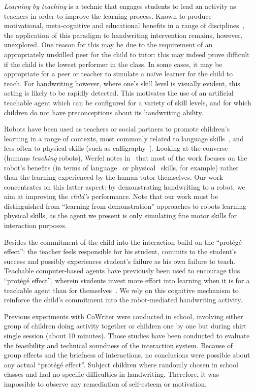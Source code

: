 \documentclass{sig-alternate}
\begin{document}
\emph{Learning by teaching} is a technic that engages students to lead an
activity as teachers in order to improve the learning process. Known to produce
motivational, meta-cognitive and educational benefits in a range of disciplines~\cite{Rohrbeck2003},
the application of this paradigm to handwriting intervention remains, however,
unexplored. One reason for this may be due to the requirement of an
appropriately unskilled peer for the child to tutor: this may indeed prove
difficult if the child is the lowest performer in the class.  In some cases, it
may be appropriate for a peer or teacher to simulate a na\"ive learner for the
child to teach. For handwriting however, where one's skill level is visually
evident, this acting is likely to be rapidly detected. This motivates the use of
an artificial teachable agent which can be configured for a variety of skill
levels, and for which children do not have preconceptions about its handwriting
ability.

Robots have been used as teachers or social partners to promote children's
learning in a range of contexts, most commonly related to language
skills~\cite{han2010robot}, and less often to physical skills (such as
calligraphy~\cite{Matsui2013}). Looking at the converse (humans \emph{teaching}
robots), Werfel notes in~\cite{Werfel2014} that most of the work focuses on the
robot's benefits (in terms of language~\cite{Saunders2010} or
physical~\cite{Mulling2013} skills, for example) rather than the learning
experienced by the human tutor themselves.  Our work concentrates on this latter
aspect: by demonstrating handwriting to a robot, we aim at improving the
\emph{child's} performance. Note that our work must be distinguished from
``learning from demonstration'' approaches to robots learning physical skills,
as the agent we present is only simulating fine motor skills for interaction
purposes.

Besides the commitment of the child into the interaction build on the
``prot\'eg\'e effect'': the teacher feels responsible for his student, commits
to the student's success and possibly experiences student's failure as his own
failure to teach. Teachable computer-based agents have previously been used to
encourage this ``prot\'eg\'e effect'', wherein students invest more effort into
learning when it is for a teachable agent than for themselves~\cite{Chase2009}.
We rely on this cognitive mechanism to reinforce the child's commitment into the
robot-mediated handwriting activity.

Previous experiments with CoWriter were conducted in
school, involving either group of children doing activity together \cite{Hood} or children
one by one but during shirt single session (about 10 minutes). Those
studies have been conducted to evaluate the feasibility and technical soundness
of the interaction system. Because of group effects and the briefness of
interactions, no conclusions were possible about any actual ``prot\'eg\'e
effect''. Subject children where randomly chosen in school
classes and had no specific difficulties in handwriting. Therefore, it was
impossible to observe any remediation of self-esteem or motivation.
\end{document}
